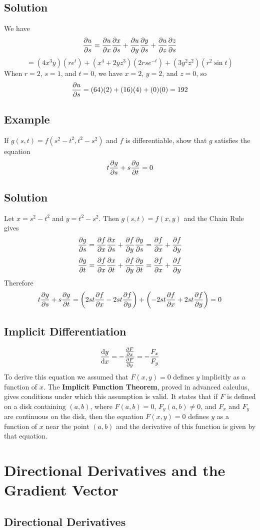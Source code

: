 \subsection*{Solution}
We have
$$\pdv{u}{s}=\pdv{u}{x}\pdv{x}{s}+\pdv{u}{y}\pdv{y}{s}+\pdv{u}{z}\pdv{z}{s}$$
$$=(4x^3y)(re^t)+(x^4+2yz^3)(2rse^{-t})+(3y^2z^2)(r^2\sin{t})$$
When $r=2$, $s=1$, and $t=0$, we have $x=2$, $y=2$, and $z=0$, so
$$\pdv{u}{s}=(64)(2)+(16)(4)+(0)(0)=192$$

\subsection*{Example}
If $g(s,t)=f(s^2-t^2,t^2-s^2)$ and $f$ is differentiable, show that $g$ satisfies
the equation
$$t\pdv{g}{s}+s\pdv{g}{t}=0$$

\subsection*{Solution}
Let $x=s^2-t^2$ and $y=t^2-s^2$. Then $g(s,t)=f(x,y)$ and the Chain Rule gives
$$\pdv{g}{s}=\pdv{f}{x}\pdv{x}{s}+\pdv{f}{y}\pdv{y}{s}=\pdv{f}{x}(2s)+\pdv{f}{y}(-2s)$$
$$\pdv{g}{t}=\pdv{f}{x}\pdv{x}{t}+\pdv{f}{y}\pdv{y}{t}=\pdv{f}{x}(-2t)+\pdv{f}{y}(2t)$$
Therefore
$$t\pdv{g}{s}+s\pdv{g}{t}=\left(2st\pdv{f}{x}-2st\pdv{f}{y}\right)+
    \left(-2st\pdv{f}{x}+2st\pdv{f}{y}\right)=0$$

\subsection*{Implicit Differentiation}
$$\dv{y}{x}=-\frac{\pdv{F}{x}}{\pdv{F}{y}}=-\frac{F_x}{F_y}$$
To derive this equation we assumed that $F(x, y) = 0$ defines $y$ implicitly as a
function of $x$. The \textbf{Implicit Function Theorem}, proved in advanced calculus,
gives conditions under which this assumption is valid. It states that if $F$ is
defined on a disk containing $(a, b)$, where $F(a, b) = 0$, $F_y(a, b)\neq 0$,
and $F_x$ and $F_y$ are continuous on the disk, then the equation $F(x, y) = 0$
defines $y$ as a function of $x$ near the point $(a, b)$ and the derivative of
this function is given by that equation.

\section{Directional Derivatives and the Gradient Vector}

\subsection*{Directional Derivatives}

